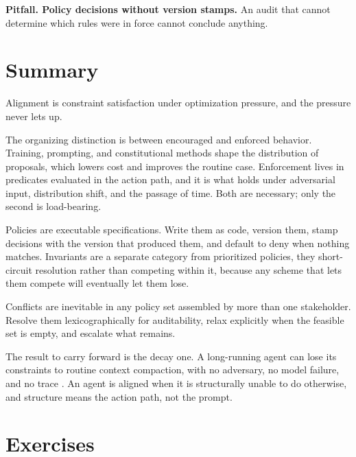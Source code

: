 \textbf{Pitfall. Policy decisions without version stamps.} An audit that cannot
determine which rules were in force cannot conclude anything.

\section{Summary}

Alignment is constraint satisfaction under optimization pressure, and the pressure
never lets up.

The organizing distinction is between encouraged and enforced behavior. Training,
prompting, and constitutional methods shape the distribution of proposals, which
lowers cost and improves the routine case. Enforcement lives in predicates
evaluated in the action path, and it is what holds under adversarial input,
distribution shift, and the passage of time. Both are necessary; only the second
is load-bearing.

Policies are executable specifications. Write them as code, version them, stamp
decisions with the version that produced them, and default to deny when nothing
matches. Invariants are a separate category from prioritized policies, they
short-circuit resolution rather than competing within it, because any scheme that
lets them compete will eventually let them lose.

Conflicts are inevitable in any policy set assembled by more than one stakeholder.
Resolve them lexicographically for auditability, relax explicitly when the
feasible set is empty, and escalate what remains.

The result to carry forward is the decay one. A long-running agent can lose its
constraints to routine context compaction, with no adversary, no model failure,
and no trace \cite{govdecay2026}. An agent is aligned when it is structurally
unable to do otherwise, and structure means the action path, not the prompt.

\section*{Exercises}

